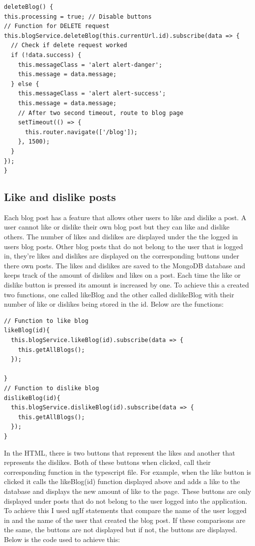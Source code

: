 \begin{lstlisting}
deleteBlog() {
this.processing = true; // Disable buttons
// Function for DELETE request
this.blogService.deleteBlog(this.currentUrl.id).subscribe(data => {
  // Check if delete request worked
  if (!data.success) {
    this.messageClass = 'alert alert-danger'; 
    this.message = data.message; 
  } else {
    this.messageClass = 'alert alert-success'; 
    this.message = data.message; 
    // After two second timeout, route to blog page
    setTimeout(() => {
      this.router.navigate(['/blog']);
    }, 1500);
  }
});
}
\end{lstlisting}

\subsection{Like and dislike posts}
Each blog post has a feature that allows other users to like and dislike a post. A user cannot like or dislike their own blog post but they can like and dislike others. The number of likes and dislikes are displayed under the the logged in users blog posts. Other blog posts that do not belong to the user that is logged in, they're likes and dislikes are displayed on the corresponding buttons under there own posts. The likes and dislikes are saved to the MongoDB database and keeps track of the amount of dislikes and likes on a post. Each time the like or dislike button is pressed its amount is increased by one. To achieve this a created two functions, one called likeBlog and the other called dislikeBlog with their number of like or dislikes being stored in the id. Below are the functions:

\begin{lstlisting}
// Function to like blog
likeBlog(id){
  this.blogService.likeBlog(id).subscribe(data => {
    this.getAllBlogs();
  });
  
}
// Function to dislike blog
dislikeBlog(id){
  this.blogService.dislikeBlog(id).subscribe(data => {
    this.getAllBlogs();
  });
}
\end{lstlisting}

In the HTML, there is two buttons that represent the likes and another that represents the dislikes. Both of these buttons when clicked, call their corresponding function in the typescript file. For example, when the like button is clicked it calls the likeBlog(id) function displayed above and adds a like to the database and displays the new amount of like to the page. These buttons are only displayed under posts that do not belong to the user logged into the application. To achieve this I used ngIf statements that compare the name of the user logged in and the name of the user that created the blog post. If these comparisons are the same, the buttons are not displayed but if not, the buttons are displayed. Below is the code used to achieve this:

